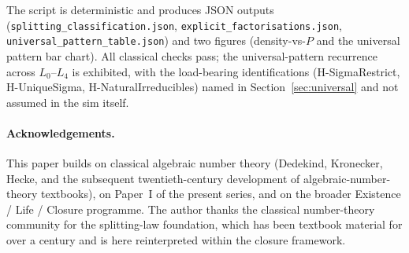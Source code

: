 \documentclass[11pt,a4paper]{article}
\theoremstyle{definition}
\theoremstyle{remark}
\begin{document}
The script is deterministic and produces JSON outputs
(\texttt{splitting\_classification.json},
\texttt{explicit\_factorisations.json},
\texttt{universal\_pattern\_table.json}) and two figures
(density-vs-$P$ and the universal pattern bar chart). All classical
checks pass; the universal-pattern recurrence across $L_0$--$L_4$
is exhibited, with the load-bearing identifications (H-SigmaRestrict,
H-UniqueSigma, H-NaturalIrreducibles) named in
Section~\ref{sec:universal} and not assumed in the sim itself.

\paragraph{Acknowledgements.}
This paper builds on classical algebraic number theory (Dedekind,
Kronecker, Hecke, and the subsequent twentieth-century development of
algebraic-number-theory textbooks), on Paper~I of the present series, and
on the broader Existence / Life / Closure programme. The author thanks
the classical number-theory community for the splitting-law foundation,
which has been textbook material for over a century and is here
reinterpreted within the closure framework.



\end{document}
